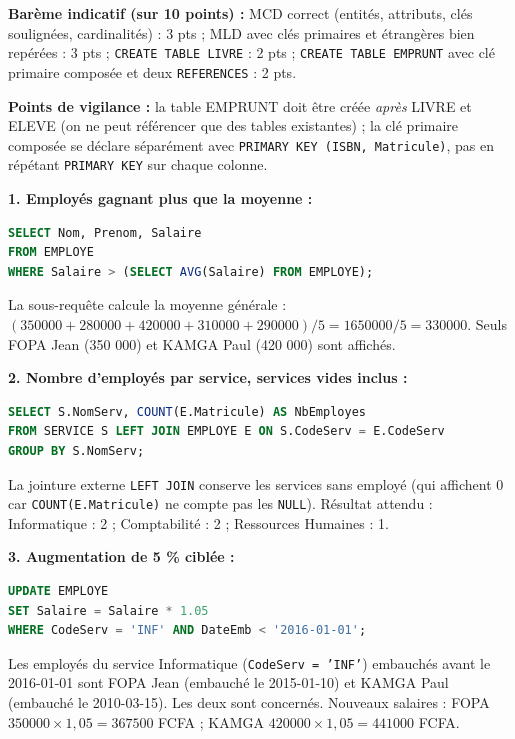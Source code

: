 \documentclass[11pt]{article}
\begin{document}
\begin{corrige}
\textbf{Barème indicatif (sur 10 points) :} MCD correct (entités, attributs, clés soulignées, cardinalités) : 3 pts ; MLD avec clés primaires et étrangères bien repérées : 3 pts ; \texttt{CREATE TABLE LIVRE} : 2 pts ; \texttt{CREATE TABLE EMPRUNT} avec clé primaire composée et deux \texttt{REFERENCES} : 2 pts.

\textbf{Points de vigilance :} la table EMPRUNT doit être créée \emph{après} LIVRE et ELEVE (on ne peut référencer que des tables existantes) ; la clé primaire composée se déclare séparément avec \texttt{PRIMARY KEY (ISBN, Matricule)}, pas en répétant \texttt{PRIMARY KEY} sur chaque colonne.
\end{corrige}

\begin{corrige}
\textbf{1. Employés gagnant plus que la moyenne :}
\begin{lstlisting}[language=SQL]
SELECT Nom, Prenom, Salaire
FROM EMPLOYE
WHERE Salaire > (SELECT AVG(Salaire) FROM EMPLOYE);
\end{lstlisting}
La sous-requête calcule la moyenne générale : $(350000 + 280000 + 420000 + 310000 + 290000) / 5 = 1650000 / 5 = 330000$. Seuls FOPA Jean (350 000) et KAMGA Paul (420 000) sont affichés.

\textbf{2. Nombre d'employés par service, services vides inclus :}
\begin{lstlisting}[language=SQL]
SELECT S.NomServ, COUNT(E.Matricule) AS NbEmployes
FROM SERVICE S LEFT JOIN EMPLOYE E ON S.CodeServ = E.CodeServ
GROUP BY S.NomServ;
\end{lstlisting}
La jointure externe \texttt{LEFT JOIN} conserve les services sans employé (qui affichent 0 car \texttt{COUNT(E.Matricule)} ne compte pas les \texttt{NULL}). Résultat attendu : Informatique : 2 ; Comptabilité : 2 ; Ressources Humaines : 1.

\textbf{3. Augmentation de 5 \% ciblée :}
\begin{lstlisting}[language=SQL]
UPDATE EMPLOYE
SET Salaire = Salaire * 1.05
WHERE CodeServ = 'INF' AND DateEmb < '2016-01-01';
\end{lstlisting}
Les employés du service Informatique (\texttt{CodeServ = 'INF'}) embauchés avant le 2016-01-01 sont FOPA Jean (embauché le 2015-01-10) et KAMGA Paul (embauché le 2010-03-15). Les deux sont concernés.
Nouveaux salaires : FOPA $350000 \times 1,05 = 367500$ FCFA ; KAMGA $420000 \times 1,05 = 441000$ FCFA.


\end{corrige}
\end{document}
